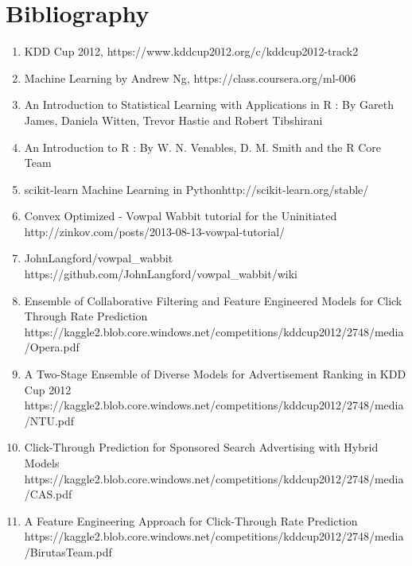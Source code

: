 \documentclass[10pt]{article}
\begin{document}
\section{Bibliography}
\begin{enumerate}
	\item KDD Cup 2012, https://www.kddcup2012.org/c/kddcup2012-track2
	\item Machine Learning by Andrew Ng, https://class.coursera.org/ml-006
	\item An Introduction to Statistical Learning with Applications in R : By Gareth James, Daniela Witten, Trevor Hastie and Robert Tibshirani
	\item An Introduction to R : By W. N. Venables, D. M. Smith and the R Core Team
	\item scikit-learn Machine Learning in Pythonhttp://scikit-learn.org/stable/
	\item Convex Optimized - Vowpal Wabbit tutorial for the Uninitiated http://zinkov.com/posts/2013-08-13-vowpal-tutorial/
	\item JohnLangford/vowpal\_wabbit https://github.com/JohnLangford/vowpal\_wabbit/wiki
	\item Ensemble of Collaborative Filtering and Feature Engineered Models for Click Through Rate Prediction \\https://kaggle2.blob.core.windows.net/competitions/kddcup2012/2748/media/Opera.pdf
	\item A Two-Stage Ensemble of Diverse Models for Advertisement Ranking in KDD Cup 2012 \\https://kaggle2.blob.core.windows.net/competitions/kddcup2012/2748/media/NTU.pdf
	\item Click-Through Prediction for Sponsored Search Advertising with Hybrid Models \\https://kaggle2.blob.core.windows.net/competitions/kddcup2012/2748/media/CAS.pdf
	\item A Feature Engineering Approach for Click-Through Rate Prediction \\https://kaggle2.blob.core.windows.net/competitions/kddcup2012/2748/media/BirutasTeam.pdf
\end{enumerate}
	

\nocite{*}		

		
\end{document}

